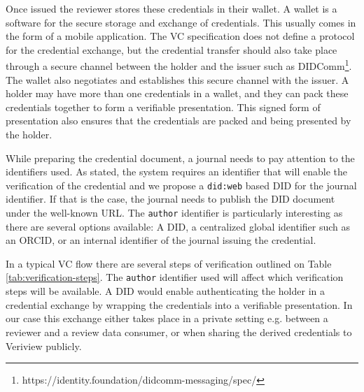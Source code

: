 Once issued the reviewer stores these credentials in their wallet. A wallet is a software for the secure storage and exchange of credentials. This usually comes in the form of a mobile application. The VC specification does not define a protocol for the credential exchange, but the credential transfer should also take place through a secure channel between the holder and the issuer such as DIDComm\footnote{https://identity.foundation/didcomm-messaging/spec/}. The wallet also negotiates and establishes this secure channel with the issuer. A holder may have more than one credentials in a wallet, and they can pack these credentials together to form a verifiable presentation. This signed form of presentation also ensures that the credentials are packed and being presented by the holder.

While preparing the credential document, a journal needs to pay attention to the identifiers used. As stated, the system requires an identifier that will enable the verification of the credential and we propose a \lstinline{did:web} based \acrshort{DID} for the journal identifier. If that is the case, the journal needs to publish the \acrshort{DID} document under the well-known \acrshort{URL}. The \lstinline{author} identifier is particularly interesting as there are several options available: A \acrfull{DID}, a centralized global identifier such as an \acrshort{ORCID}, or an internal identifier of the journal issuing the credential.


In a typical \acrshort{VC} flow there are several steps of verification outlined on Table \ref{tab:verification-steps}. The \lstinline{author} identifier used will affect which verification steps will be available. A \acrshort{DID} would enable authenticating the holder in a credential exchange by wrapping the credentials into a verifiable presentation. In our case this exchange either takes place in a private setting e.g. between a reviewer and a review data consumer, or when sharing the derived credentials to Veriview publicly. 



